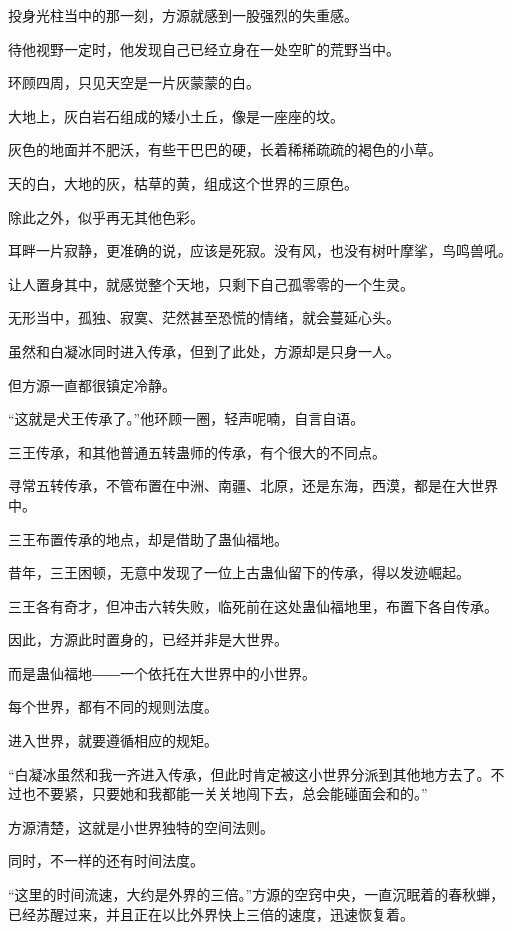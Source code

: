 
\begin{this_body}

投身光柱当中的那一刻，方源就感到一股强烈的失重感。

待他视野一定时，他发现自己已经立身在一处空旷的荒野当中。

环顾四周，只见天空是一片灰蒙蒙的白。

大地上，灰白岩石组成的矮小土丘，像是一座座的坟。

灰色的地面并不肥沃，有些干巴巴的硬，长着稀稀疏疏的褐色的小草。

天的白，大地的灰，枯草的黄，组成这个世界的三原色。

除此之外，似乎再无其他色彩。

耳畔一片寂静，更准确的说，应该是死寂。没有风，也没有树叶摩挲，鸟鸣兽吼。

让人置身其中，就感觉整个天地，只剩下自己孤零零的一个生灵。

无形当中，孤独、寂寞、茫然甚至恐慌的情绪，就会蔓延心头。

虽然和白凝冰同时进入传承，但到了此处，方源却是只身一人。

但方源一直都很镇定冷静。

“这就是犬王传承了。”他环顾一圈，轻声呢喃，自言自语。

三王传承，和其他普通五转蛊师的传承，有个很大的不同点。

寻常五转传承，不管布置在中洲、南疆、北原，还是东海，西漠，都是在大世界中。

三王布置传承的地点，却是借助了蛊仙福地。

昔年，三王困顿，无意中发现了一位上古蛊仙留下的传承，得以发迹崛起。

三王各有奇才，但冲击六转失败，临死前在这处蛊仙福地里，布置下各自传承。

因此，方源此时置身的，已经并非是大世界。

而是蛊仙福地――一个依托在大世界中的小世界。

每个世界，都有不同的规则法度。

进入世界，就要遵循相应的规矩。

“白凝冰虽然和我一齐进入传承，但此时肯定被这小世界分派到其他地方去了。不过也不要紧，只要她和我都能一关关地闯下去，总会能碰面会和的。”

方源清楚，这就是小世界独特的空间法则。

同时，不一样的还有时间法度。

“这里的时间流速，大约是外界的三倍。”方源的空窍中央，一直沉眠着的春秋蝉，已经苏醒过来，并且正在以比外界快上三倍的速度，迅速恢复着。


\end{this_body}

